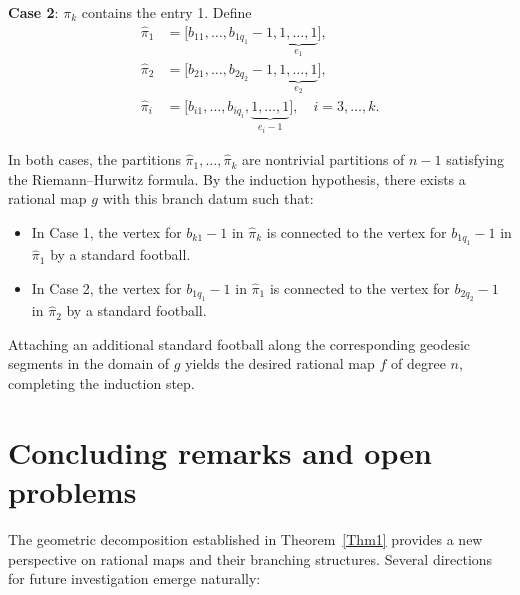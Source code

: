 \documentclass[microtype]{gtpart}     %
\theoremstyle{definition}
\begin{document}
\noindent \textbf{Case 2}: \( \pi_k \) contains the entry 1.
Define
\[
\begin{aligned}
\hat{\pi}_1 &= \big[ b_{11}, \dots, b_{1q_1} - 1, \underbrace{1, \dots, 1}_{e_1} \big], \\
\hat{\pi}_2 &= \big[ b_{21}, \dots, b_{2q_2} - 1, \underbrace{1, \dots, 1}_{e_2} \big], \\
\hat{\pi}_i &= \big[ b_{i1}, \dots, b_{iq_i}, \underbrace{1, \dots, 1}_{e_i - 1} \big], \quad i = 3, \dots, k.
\end{aligned}
\]

In both cases, the partitions \( \hat{\pi}_1, \dots, \hat{\pi}_k \) are nontrivial partitions of \( n - 1 \) satisfying the Riemann--Hurwitz formula. By the induction hypothesis, there exists a rational map \( g \) with this branch datum such that:
\begin{itemize}
    \item In Case 1, the vertex for \( b_{k1} - 1 \) in \( \hat{\pi}_k \) is connected to the vertex for \( b_{1q_1} - 1 \) in \( \hat{\pi}_1 \) by a standard football.
    \item In Case 2, the vertex for \( b_{1q_1} - 1 \) in \( \hat{\pi}_1 \) is connected to the vertex for \( b_{2q_2} - 1 \) in \( \hat{\pi}_2 \) by a standard football.
\end{itemize}

Attaching an additional standard football along the corresponding geodesic segments in the domain of \( g \) yields the desired rational map \( f \) of degree \( n \), completing the induction step.



\section{Concluding remarks and open problems}

The geometric decomposition established in Theorem~\ref{Thm1} provides a new
perspective on rational maps and their branching structures. Several
directions for future investigation emerge naturally:
\end{document}
